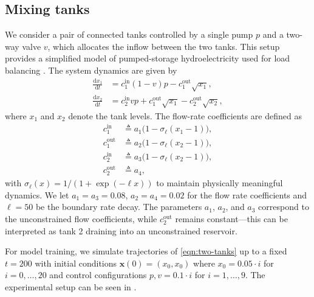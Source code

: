 \documentclass[11pt,twoside]{article}
\theoremstyle{plain}
\theoremstyle{definition}
\theoremstyle{remark}
\newcommand{\vect}[1]{\boldsymbol{#1}}
\begin{document}
\subsection{Mixing tanks}
\label{sec:mixing-tanks}
We consider a pair of connected tanks controlled by a single pump \(p\) and a two-way valve \(v\), which allocates the inflow between the two tanks. This setup provides a simplified model of pumped-storage hydroelectricity used for load balancing \cite{DOE_PumpedStorageHydropower}. The system dynamics are given by 
\begin{equation}
    \begin{split}
        \frac{\mathrm{d} x_1}{\mathrm{d}t} &= c_1^{\text{in}}(1-v)p - c_1^{\text{out}} \sqrt{x_1},\\
        \frac{\mathrm{d} x_2}{\mathrm{d}t} &= c_2^{\text{in}} v p + c_1^{\text{out}} \sqrt{x_1} - c_2^{\text{out}} \sqrt{x_2},
    \end{split}
    \label{eqn:two-tanks}
\end{equation}
where \(x_1\) and \(x_2\) denote the tank levels. The flow-rate coefficients are defined as
\begin{equation}
    \begin{split}
        c_1^{\text{in}} &\triangleq a_1\bigl(1 - \sigma_\ell(x_1 - 1)\bigr),\\
        c_1^{\text{out}} &\triangleq a_2\bigl(1 - \sigma_\ell(x_2 - 1)\bigr),\\
         c_2^{\text{in}} &\triangleq a_3\bigl(1 - \sigma_\ell(x_2 - 1)\bigr),\\
        c_2^{\text{out}} &\triangleq a_4,
    \end{split}
    \label{eqn:flow-rate-coeff}
\end{equation}
with \(\sigma_\ell(x) = 1/(1+\exp(-\ell x))\) to maintain physically meaningful dynamics.  We let \(a_1 = a_3= 0.08\), \(a_2 = a_4 = 0.02\) for the flow rate coefficients and \(\ell = 50\) be the boundary rate decay. The parameters \(a_1\), \(a_2\), and \(a_3\) correspond to the unconstrained flow coefficients, while \(c_2^{\text{out}}\) remains constant---this can be interpreted as tank 2 draining into an unconstrained reservoir.

For model training, we simulate trajectories of \cref{eqn:two-tanks} up to a fixed \(t=200\) with initial conditions \(\vect{x}(0) = (x_0, x_0)\) where \(x_0 = 0.05 \cdot i\) for \(i=0, \hdots, 20\) and control configurations \(p,v = 0.1 \cdot i\) for \(i=1, \hdots, 9\). The experimental setup can be seen in .
\end{document}
